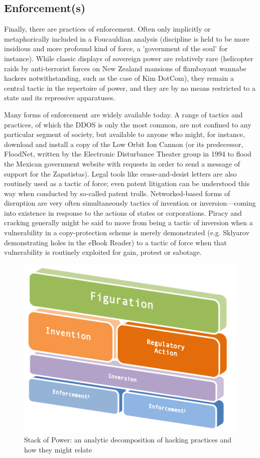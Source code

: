 \documentclass[10pt,letter,oneside]{scrartcl}
\begin{document}
\subsection*{Enforcement(s)}

Finally, there are practices of enforcement. Often only implicitly or
metaphorically included in a Foucauldian analysis (discipline is held to be
more insidious and more profound kind of force, a 'government of the soul' for
instance).  While classic displays of sovereign power are relatively rare
(helicopter raids by anti-terrorist forces on New Zealand mansions of
flamboyant wannabe hackers notwithstanding, such as the case of Kim DotCom), 
they remain a central tactic in the repertoire of power, and they are by no means
restricted to a state and its repressive apparatuses.

Many forms of enforcement are widely available today.  A range of tactics and
practices, of which the DDOS is only the most common, are not confined to any
particular segment of society, but available to anyone who might, for instance,
download and install a copy of the Low Orbit Ion Cannon (or its predecessor,
FloodNet, written by the Electronic Disturbance Theater group in 1994 to flood
the Mexican government website with requests in order to send a message of
support for the Zapatistas).  Legal tools like cease-and-desist letters are also
routinely used as a tactic of force; even patent litigation can be understood this
way when conducted by so-called patent trolls.  Networked-based forms of
disruption are very often simultaneously tactics of invention or
inversion—coming into existence in response to the actions of states or
corporations.  Piracy and cracking generally might be said to move from being a
tactic of inversion when a vulnerability in a copy-protection scheme is merely
demonstrated (e.g. Sklyarov demonstrating holes in the eBook Reader) to a tactic
of force when that vulnerability is routinely exploited for gain, protest or
sabotage.

\begin{figure} \centering \includegraphics[scale=0.5]{images/protocolstackV2}
\caption{Stack of Power: an analytic decomposition of hacking
practices and how they might relate} \label{fig:ProtocolStack} \end{figure}
\end{document}
